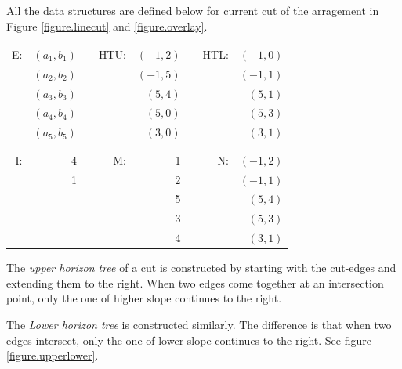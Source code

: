 \documentclass[12pt]{article}
\begin{document}
        All the data structures are defined below for current cut of the arragement in Figure \ref{figure.linecut} and \ref{figure.overlay}. \\


        \begin{tabular}{rrcrrcrr}
            E:  & $(a_1, b_1)$ &    & HTU:  & $(-1, 2)$ &  & HTL: & $(-1, 0)$ \\ 
                & $(a_2, b_2)$ &    &       & $(-1, 5)$ & &       & $(-1, 1)$\\
                & $(a_3, b_3)$ &    &       & $(5,  4)$ & &       & $(5,  1)$\\
                & $(a_4, b_4)$ &    &       & $(5,  0)$ & &       & $(5,  3)$\\
                & $(a_5, b_5)$ &    &       & $(3,  0)$ & &       & $(3,  1)$\\
            & & & & & & & \\
            \hline
            & & & & & & & \\
            I:  & 4            &    & M:    & 1         &  & N:   & $(-1, 2)$\\
                & 1            &    &       & 2         &  &      & $(-1, 1)$\\
                &              &    &       & 5         &  &      & $(5,  4)$\\
                &              &    &       & 3         &  &      & $(5,  3)$\\
                &              &    &       & 4         &  &      & $(3,  1)$ \\
        \end{tabular}

        


        \pagebreak

        The {\em upper horizon tree} of a cut is constructed by starting with the
        cut-edges and extending them to the right. When two edges come together
        at an intersection point, only the one of higher slope continues to the
        right. 
        

        The {\em Lower horizon tree} is constructed similarly.  The difference is
        that when two edges intersect, only the one of lower slope continues
        to the right. See figure \ref{figure.upperlower}.
\end{document}
